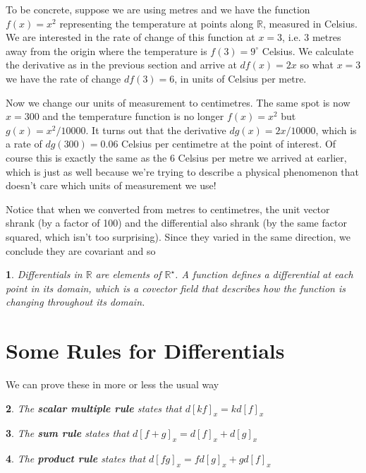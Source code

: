 \documentclass[oneside,english]{amsbook}
\numberwithin{section}{chapter}
\theoremstyle{plain}
\newtheorem{thm}{\protect\theoremname}
\theoremstyle{definition}
\providecommand{\theoremname}{Theorem}
\begin{document}
			To be concrete, suppose we are using metres and we have the function $f(x) = x^2$ representing the temperature at points along $\mathbb{R}$, measured in Celsius. We are interested in the rate of change of this function at $x = 3$, i.e. 3 metres away from the origin where the temperature is $f(3) = 9^\circ$ Celsius. We calculate the derivative as in the previous section and arrive at $df(x) = 2x$ so what $x = 3$ we have the rate of change $df(3) = 6$, in units of Celsius per metre.
			
			Now we change our units of measurement to centimetres. The same spot is now $x = 300$ and the temperature function is no longer $f(x) = x^2$ but $g(x) = x^2/10000$. It turns out that the derivative $dg(x) = 2x/10000$, which is a rate of $dg(300) = 0.06$ Celsius per centimetre at the point of interest. Of course this is exactly the same as the 6 Celsius per metre we arrived at earlier, which is just as well because we're trying to describe a physical phenomenon that doesn't care which units of measurement we use!
			
			Notice that when we converted from metres to centimetres, the unit vector shrank (by a factor of 100) and the differential also shrank (by the same factor squared, which isn't too surprising). Since they varied in the same direction, we conclude they are covariant and so
			
			\begin{thm}
				Differentials in $\mathbb{R}$ are elements of $\mathbb{R}^\star$. A function defines a differential at each point in its domain, which is a covector field that describes how the function is changing throughout its domain.
			\end{thm}
						
		\section{Some Rules for Differentials}
			
			We can prove these in more or less the usual way
			
			\begin{thm}
				The \textbf{scalar multiple rule} states that $d[kf]_x = kd[f]_x$
			\end{thm}
			
			\begin{thm}
				The \textbf{sum rule} states that $d[f + g]_x = d[f]_x + d[g]_x$
			\end{thm}
			
			\begin{thm}
				The \textbf{product rule} states that $d[fg]_x = fd[g]_x + gd[f]_x$
			\end{thm}
			
\end{document}
